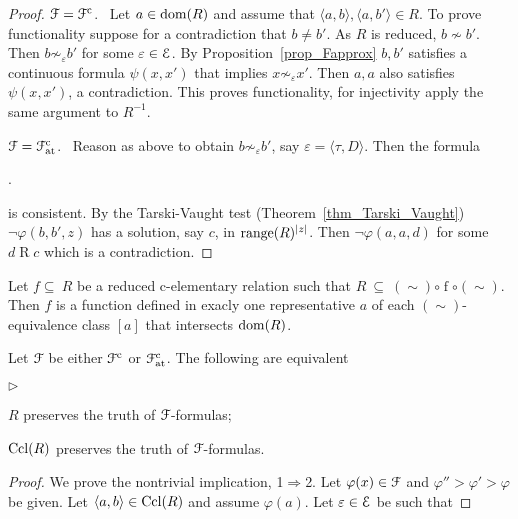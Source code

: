 \documentclass{amsproc}
\newcommand{\mylabel}[1]{{#1}\hfill}
\renewenvironment{itemize}
  {\begin{list}{$\triangleright$}{%
  \setlength{\parskip}{0mm}
  \setlength{\topsep}{.4\baselineskip}
  \setlength{\rightmargin}{0mm}
  \setlength{\listparindent}{0mm}
  \setlength{\itemindent}{0mm}
  \setlength{\labelwidth}{3ex}
  \setlength{\itemsep}{.2\baselineskip}
  \setlength{\parsep}{.2\baselineskip}
  \setlength{\partopsep}{0mm}
  \setlength{\labelsep}{1ex}
  \setlength{\leftmargin}{\labelwidth+\labelsep}
  \let\makelabel\mylabel}}{%
\end{list}}
\begin{document}
{\begin{proof}
  ${\EuScript F}={\EuScript F}^{\rm c}$. \ 
  Let $a\in{\rm dom}(R)$ and assume that $\langle a,b\rangle,\langle a,b'\rangle\in R$.
  To prove functionality suppose for a contradiction that $b\neq b'$.
  As $R$ is reduced, $b\not\sim b'$.
  Then $b\not\sim_\varepsilon b'$ for some $\varepsilon\in{\EuScript E}$.
  By Proposition~\ref{prop_Fapprox} $b,b'$ satisfies a continuous formula $\psi(x,x')$ that implies  $x\not\sim_\varepsilon x'$.
  Then $a,a$ also satisfies $\psi(x,x')$, a contradiction.
  This proves functionality, for injectivity apply the same argument to $R^{-1}$.

  ${\EuScript F}={\EuScript F}^{\rm c}_{\rm at}$. \ 
  Reason as above to obtain $b\not\sim_\varepsilon b'$, say $\varepsilon=\langle\tau,D\rangle$.
  Then the formula 
  
  .
  
  is consistent.
  By the Tarski-Vaught test (Theorem~\ref{thm_Tarski_Vaught}) $\neg\varphi(b,b',z)$ has a solution, say $c$, in ${\rm range}(R)^{|z|}$.
  Then $\neg\varphi(a,a,d)$ for some $d\mathrel{R} c$ which is a contradiction.
\end{proof}

Let $f \subseteq\ R$ be a reduced c-elementary relation such that $R\ \subseteq\ \mathrel{(\sim)}\circ \mathrel{f}\circ\mathrel{(\sim)}$.
Then $f$ is a function defined in exacly one representative $a$ of each $(\sim)$-equivalence class $[a]$ that intersects ${\rm dom}(R)$.

\begin{fact}\label{fact_Rcompletion}
  Let ${\EuScript F}$ be either ${\EuScript F}^{\rm c}$ or ${\EuScript F}^{\rm c}_{\rm at}$.
  The following are equivalent
  \begin{itemize}
    \item[1.] $R$ preserves the truth of ${\EuScript F}$-formulas;
    \item[2.] ${\rm Ccl}(R)$ preserves the truth of ${\EuScript F}$-formulas.
  \end{itemize}
\end{fact}

\begin{proof}
  We prove the nontrivial implication, 1$\Rightarrow$2.
  Let $\varphi(x)\in{\EuScript F}$ and $\varphi''>\varphi'>\varphi$ be given.
  Let $\langle a,b\rangle\in{\rm Ccl}(R)$ and assume $\varphi(a)$.
  Let $\varepsilon\in{\EuScript E}$ be such that 


\end{proof}}
\end{document}
